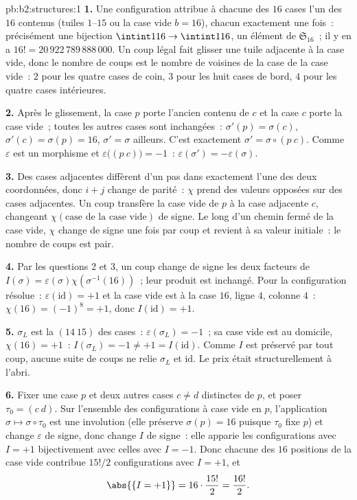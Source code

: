 \begin{solution}{pb:b2:structures:1}
\textbf{1.} Une configuration attribue à chacune des $16$ cases l'un
des $16$ contenus (tuiles $1$--$15$ ou la case vide $b = 16$),
chacun exactement une fois~: précisément une bijection $\intint1{16}
\to \intint1{16}$, un élément de $\mathfrak{S}_{16}$~; il y en a $16!
= 20\,922\,789\,888\,000$. Un coup légal fait glisser une tuile
adjacente à la case vide, donc le nombre de coups est le nombre de
voisines de la case de la case vide~: $2$ pour les quatre cases de
coin, $3$ pour les huit cases de bord, $4$ pour les quatre cases
intérieures.

\textbf{2.} Après le glissement, la case $p$ porte l'ancien contenu
de $c$ et la case $c$ porte la case vide~; toutes les autres cases
sont inchangées~: $\sigma'(p) = \sigma(c)$, $\sigma'(c) = \sigma(p) =
16$, $\sigma' = \sigma$ ailleurs. C'est exactement $\sigma' = \sigma
\circ (p\ c)$. Comme $\varepsilon$ est un morphisme et
$\varepsilon\bigl((p\ c)\bigr) = -1$~:
$\varepsilon(\sigma') = -\varepsilon(\sigma)$.

\textbf{3.} Des cases adjacentes diffèrent d'un pas dans exactement
l'une des deux coordonnées, donc $i + j$ change de parité~: $\chi$
prend des valeurs opposées sur des cases adjacentes. Un coup
transfère la case vide de $p$ à la case adjacente $c$, changeant
$\chi(\text{case de la case vide})$ de signe. Le long d'un chemin
fermé de la case vide, $\chi$ change de signe une fois par coup et
revient à sa valeur initiale~: le nombre de coups est pair.

\textbf{4.} Par les questions 2 et 3, un coup change de signe les
deux facteurs de $I(\sigma) = \varepsilon(\sigma)\chi(\sigma^{-1}(16))$~;
leur produit est inchangé. Pour la configuration résolue~:
$\varepsilon(\mathrm{id}) = +1$ et la case vide est à la case $16$,
ligne $4$, colonne $4$~: $\chi(16) = (-1)^{8} = +1$, donc
$I(\mathrm{id}) = +1$.

\textbf{5.} $\sigma_L$ est la  $(14\ 15)$ des cases~:
$\varepsilon(\sigma_L) = -1$~; sa case vide est au domicile, $\chi(16)
= +1$~: $I(\sigma_L) = -1 \neq +1 = I(\mathrm{id})$. Comme $I$ est
préservé par tout coup, aucune suite de coups ne relie $\sigma_L$
et $\mathrm{id}$. Le prix était structurellement à l'abri.

\textbf{6.} Fixer une case $p$ et deux autres cases $c \neq d$
distinctes de $p$, et poser $\tau_0 = (c\ d)$. Sur l'ensemble des
configurations à case vide en $p$, l'application $\sigma \mapsto
\sigma \circ \tau_0$ est une involution (elle préserve $\sigma(p) =
16$ puisque $\tau_0$ fixe $p$) et change $\varepsilon$ de signe, donc
change $I$ de signe~: elle apparie les configurations avec $I = +1$
bijectivement avec celles avec $I = -1$. Donc chacune des $16$
positions de la case vide contribue $15!/2$ configurations avec $I =
+1$, et
\[
\abs{\{I = +1\}} = 16 \cdot \frac{15!}{2} = \frac{16!}{2}.
\]


\end{solution}
